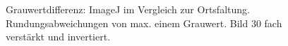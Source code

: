 \documentclass[a4paper,12pt]{article}
\begin{document}
\begin{figure}[htbp]
\caption{Grauwertdifferenz: ImageJ im Vergleich zur Ortsfaltung.
Rundungsabweichungen von max. einem Grauwert. Bild 30 fach verstärkt und
invertiert.}%
\label{figure_border_imageJ}
\end{figure}
  
\end{document}
